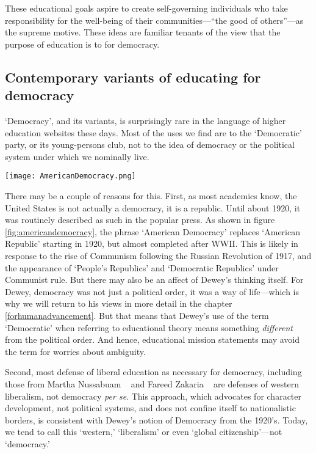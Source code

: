 These educational goals aspire to create self-governing individuals who take responsibility for the well-being of their communities---``the good of others''---as the supreme motive. These ideas are familiar tenants of the view that the purpose of education is to for democracy.

\subsection{Contemporary variants of educating for democracy}
\label{contemporaryvariantsofeducatingfordemocracy}

`Democracy', and its variants, is surprisingly rare in the language of higher education websites these days. Most of the uses we find are to the `Democratic' party, or its young-persons club, not to the idea of democracy or the political system under which we nominally live.\\
\begin{figure*}\texttt{[image: AmericanDemocracy.png]}\caption{Google books' ngrams viewer chart for 1800-2000. 'American Democracy' compared to 'American Republic'.}\label{fig:americandemocracy}\end{figure*}

There may be a couple of reasons for this. First, as most academics know, the United States is not actually a democracy, it is a republic. Until about 1920, it was routinely described as such in the popular press. As shown in figure \ref{fig:americandemocracy}, the phrase `American Democracy' replaces `American Republic' starting in 1920, but almost completed after WWII. This is likely in response to the rise of Communism following the Russian Revolution of 1917, and the appearance of `People's Republics' and `Democratic Republics' under Communist rule. But there may also be an affect of Dewey's thinking itself. For Dewey, democracy was not just a political order, it was a way of life---which is why we will return to his views in more detail in the chapter \ref{forhumanadvancement}. But that means that Dewey's use of the term `Democratic' when referring to educational theory means something \emph{different} from the political order. And hence, educational mission statements may avoid the term for worries about ambiguity.

Second, most defense of liberal education as necessary for democracy, including those from Martha Nussabuam ~\citep{Nussbaum:LOAZzHzC} and Fareed Zakaria ~\citep{Zakaria:2015uy} are defenses of western liberalism, not democracy \emph{per se}. This approach, which advocates for character development, not political systems, and does not confine itself to nationalistic borders, is consistent with Dewey's notion of Democracy from the 1920's. Today, we tend to call this `western,' `liberalism' or even `global citizenship'---not `democracy.'

